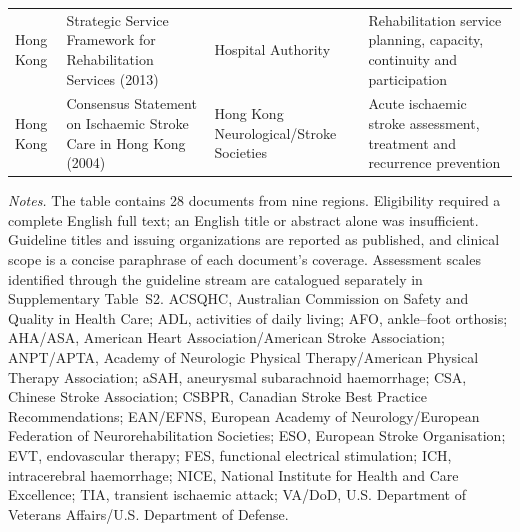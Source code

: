 \begin{landscape}
\begin{longtable}{@{}
>{\RaggedRight\arraybackslash}p{2.10cm}
>{\RaggedRight\arraybackslash}p{8.70cm}
>{\RaggedRight\arraybackslash}p{4.20cm}
>{\RaggedRight\arraybackslash}p{8.70cm}
@{}}
Hong Kong & Strategic Service Framework for Rehabilitation Services (2013) \cite{S1HospitalAuthority2013RehabSSF} & Hospital Authority & Rehabilitation service planning, capacity, continuity and participation \\
Hong Kong & Consensus Statement on Ischaemic Stroke Care in Hong Kong (2004) \cite{S1HongKong2004IschaemicStrokeConsensus} & Hong Kong Neurological/Stroke Societies & Acute ischaemic stroke assessment, treatment and recurrence prevention \\
\end{longtable}
\noindent\footnotesize\textit{Notes.} The table contains 28 documents from nine regions. Eligibility required a complete English full text; an English title or abstract alone was insufficient. Guideline titles and issuing organizations are reported as published, and clinical scope is a concise paraphrase of each document's coverage. Assessment scales identified through the guideline stream are catalogued separately in Supplementary Table~S2. ACSQHC, Australian Commission on Safety and Quality in Health Care; ADL, activities of daily living; AFO, ankle--foot orthosis; AHA/ASA, American Heart Association/American Stroke Association; ANPT/APTA, Academy of Neurologic Physical Therapy/American Physical Therapy Association; aSAH, aneurysmal subarachnoid haemorrhage; CSA, Chinese Stroke Association; CSBPR, Canadian Stroke Best Practice Recommendations; EAN/EFNS, European Academy of Neurology/European Federation of Neurorehabilitation Societies; ESO, European Stroke Organisation; EVT, endovascular therapy; FES, functional electrical stimulation; ICH, intracerebral haemorrhage; NICE, National Institute for Health and Care Excellence; TIA, transient ischaemic attack; VA/DoD, U.S. Department of Veterans Affairs/U.S. Department of Defense.
\endgroup
\end{landscape}
